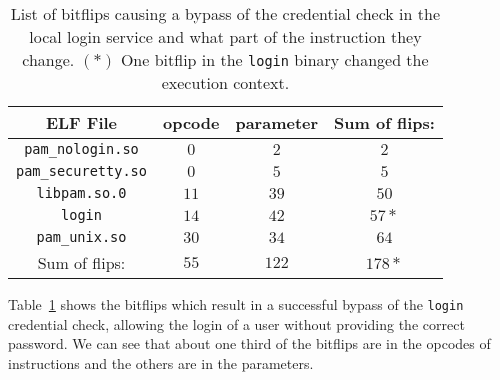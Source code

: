 \begin{table}[!htb]
\centering
\begin{tabular}{c|cc|c}
ELF File & opcode & parameter & Sum of flips:     \\ \hline
\texttt{pam\_nologin.so}   & $0$ & $2$  & $2$     \\
\texttt{pam\_securetty.so} & $0$ & $5$  & $5$     \\
\texttt{libpam.so.0}       & $11$ & $39$ & $50$   \\
\texttt{login}             & $14$ & $42$ & $57*$  \\
\texttt{pam\_unix.so}      & $30$ & $34$ & $64$ \\ \hline
Sum of flips:              & $55$ & $122$ & $178*$
\end{tabular}
\caption{List of bitflips causing a bypass of the credential check in the local
login service and what part of the instruction they change. $(*)$ One bitflip
in the \texttt{login} binary changed the execution context.}
\label{tab:loginres}
\end{table}

Table~\ref{tab:loginres} shows the bitflips which result in a successful bypass
of the \texttt{login} credential check, allowing the login of a user without
providing the correct password. We can see that about one third of the bitflips
are in the opcodes of instructions and the others are in the parameters.

